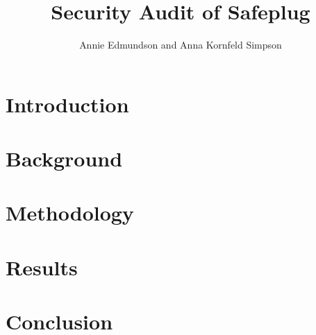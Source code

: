 \documentclass[12pt, letterpaper]{article}
\title{Security Audit of Safeplug}
\author{Annie Edmundson and Anna Kornfeld Simpson}
\begin{document}
\maketitle

\section{Introduction}

\section{Background}

\section{Methodology}

\section{Results}

\section{Conclusion}


\end{document}
